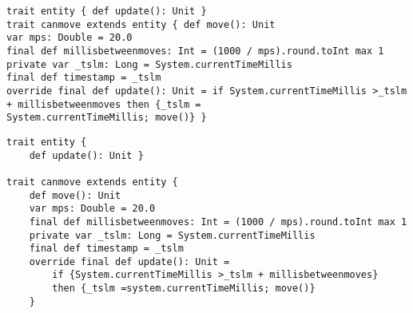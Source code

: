 \begin{lstlisting}
trait entity { def update(): Unit }
trait canmove extends entity { def move(): Unit
var mps: Double = 20.0
final def millisbetweenmoves: Int = (1000 / mps).round.toInt max 1
private var _tslm: Long = System.currentTimeMillis
final def timestamp = _tslm
override final def update(): Unit = if System.currentTimeMillis >_tslm + millisbetweenmoves then {_tslm =
System.currentTimeMillis; move()} }
\end{lstlisting}

\begin{lstlisting}
trait entity { 
	def update(): Unit }
	
trait canmove extends entity { 
	def move(): Unit
	var mps: Double = 20.0
	final def millisbetweenmoves: Int = (1000 / mps).round.toInt max 1
	private var _tslm: Long = System.currentTimeMillis
	final def timestamp = _tslm
	override final def update(): Unit = 
		if {System.currentTimeMillis >_tslm + millisbetweenmoves}
		then {_tslm =system.currentTimeMillis; move()} 
	}
\end{lstlisting}
